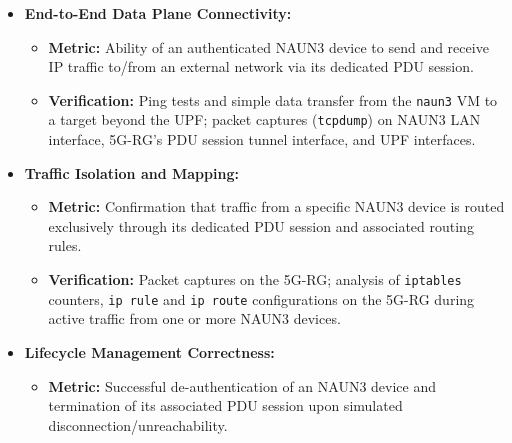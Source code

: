 \begin{enumerate}
{\begin{itemize}
{\begin{itemize}
                    \item \textbf{Metric (\ac{5GC}):} Successful assignment of a \ac{5GC} \ac{IP} address by the \ac{5GC} (\ac{SMF}/\ac{UPF}) to the dedicated \ac{PDU} session for the \ac{NAUN3} device.

                    \item \textbf{Verification:} \texttt{ip addr} command output on the \texttt{naun3} \ac{VM}; \texttt{dnsmasq} logs on the \ac{5G-RG}; \texttt{nr-cli ps-list} output on the \ac{5G-RG}; Open5GS \ac{SMF}/\ac{UPF} logs. 
                \end{itemize}
            }
            \item {
                \textbf{End-to-End Data Plane Connectivity:}
                \begin{itemize}
                    \item \textbf{Metric:} Ability of an authenticated \ac{NAUN3} device to send and receive \ac{IP} traffic to/from an external network via its dedicated \ac{PDU} session. 

                    \item \textbf{Verification:} Ping tests and simple data transfer from the \texttt{naun3} \ac{VM} to a target beyond the \ac{UPF}; packet captures (\texttt{tcpdump}) on \ac{NAUN3} \ac{LAN} interface, \ac{5G-RG}'s \ac{PDU} session tunnel interface, and \ac{UPF} interfaces.
                \end{itemize}
            }
            \item {
                \textbf{Traffic Isolation and Mapping:}
                \begin{itemize}
                    \item \textbf{Metric:} Confirmation that traffic from a specific \ac{NAUN3} device is routed exclusively through its dedicated \ac{PDU} session and associated routing rules. 

                    \item \textbf{Verification:} Packet captures on the \ac{5G-RG}; analysis of \texttt{iptables} counters, \texttt{ip rule} and \texttt{ip route} configurations on the \ac{5G-RG} during active traffic from one or more \ac{NAUN3} devices. 
                \end{itemize}
            }
            \item {
                \textbf{Lifecycle Management Correctness:}
                \begin{itemize}
                    \item \textbf{Metric:} Successful de-authentication of an \ac{NAUN3} device and termination of its associated \ac{PDU} session upon simulated disconnection/unreachability.


\end{itemize}}
\end{itemize}}
\end{enumerate}
